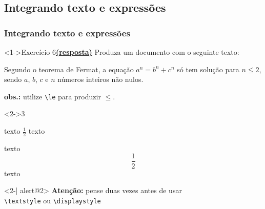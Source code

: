 \documentclass[handout,10pt]{beamer}
\begin{document}
\subsection{Integrando texto e expressões}
\begin{frame}[fragile]
	\frametitle{Integrando texto e expressões}
	
	\begin{block}<1->{Exercício 6\hyperlink{respostas1-8}{\footnotesize\textbf{(resposta)}}}
		Produza um documento com o seguinte texto:
		
		\medskip
		
		{\small Segundo o teorema de Fermat, a equação \(a^n = b^n + c^n\)
		só tem solução para \(n \le 2\), sendo \(a\), \(b\), \(c\)
		e \(n\) números inteiros não nulos.}
		
		\bigskip
		
		\footnotesize\textbf{obs.:} utilize \verb|\le| para produzir \(\le\).
	\end{block}
	
	
	\begin{atividade}<2->{3}
		\begin{LaTeXcode}
			texto \(\displaystyle \frac{1}{2}\) texto\par			
			texto \[\textstyle \frac{1}{2}\] texto
		\end{LaTeXcode}
	\end{atividade}
	
	
	\begin{center}%
		\begin{actionenv}<2-| alert@2>%
			\textbf{Atenção:} pense duas vezes antes de usar\\\verb|\textstyle| ou \verb|\displaystyle|			
		\end{actionenv}%
	\end{center}	
	
\end{frame}
\end{document}
